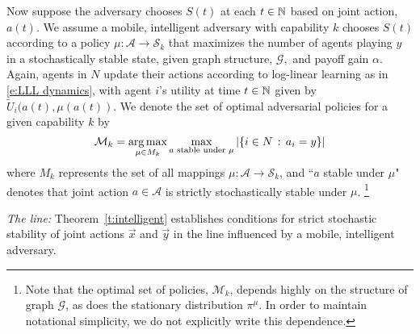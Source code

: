 Now suppose the adversary chooses $S(t)$ at each $t\in\mathbb{N}$ based on joint action, $a(t)$. We assume a mobile, intelligent adversary with capability $k$ chooses $S(t)$ according to a policy $\mu:\mathcal{A}\to \mathcal{S}_k$ that maximizes the number of agents playing $y$ in a stochastically stable state, given graph structure, $\mathcal{G},$ and payoff gain $\alpha$. 
Again, agents in $N$ update their actions according to log-linear learning as in \eqref{e:LLL dynamics}, with agent $i$'s utility at time $t\in \mathbb{N}$ given by $\tilde{U}_i(a(t),\mu(a(t))$.
We denote the set of optimal adversarial policies for a given capability $k$ by
\begin{equation}
\mathcal{M}_k= \operatorname*{arg\,max}_{\mu\in M_k}\max_{a \text{ stable under }\mu}|\{i\in N\,:\, a_i = y\}|
\end{equation}
where $M_k$ represents the set of all mappings $\mu:\mathcal{A}\to \mathcal{S}_k$, and ``$a$ stable under $\mu$" denotes that joint action $a\in\mathcal{A}$ is strictly stochastically stable under $\mu$. \footnote{Note that the optimal set of policies, $\mathcal{M}_k$, depends highly on the structure of graph $\mathcal{G}$, as does the stationary distribution $\pi^\mu$. In order to maintain notational simplicity, we do not explicitly write this dependence.}



\noindent\emph{The line:} Theorem~\ref{t:intelligent} establishes conditions for strict stochastic stability of joint actions $\vec{x}$ and $ \vec{y}$ in the line influenced by a mobile, intelligent adversary. 


